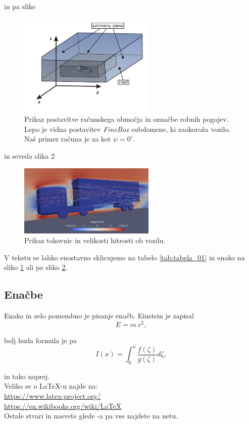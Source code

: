 \documentclass[11pt,a4]{article}
\begin{document}
in pa slike

\begin{figure}[!htbp]
	\centering \includegraphics[width=6.5cm]{figs/geometry_3D.pdf}
	\caption{Prikaz postavitve računskega območja in označbe robnih pogojev. Lepo je vidna postavitev \emph{FineBox} subdomene, ki zaokoroža vozilo. Naš primer računa je za kot $\psi=0^\circ$.}
	\label{fig:slika_01}
\end{figure}

\newpage

in seveda slika 2

\begin{figure}[!htbp]
	\centering \includegraphics[width=6.5cm]{figs/res_L_01.png}
	\caption{Prikaz tokovnic in velikosti hitrosti ob vozilu.}
	\label{fig:slika_02}
\end{figure}

V tekstu se lahko enostavno sklicujemo na tabelo \ref{tab:tabela_01} in enako na sliko \ref{fig:slika_01} ali pa sliko \ref{fig:slika_02}.

\subsection{Enačbe}
Enako in zelo pomembno je pisanje enačb. Einstein je zapisal
\[
E = m \: c^2,
\]

bolj huda formula je pa
\[
I(x) = \int_0^x \frac{f(\zeta)}{g(\zeta)} d\zeta,
\]

in tako naprej.\\[1cm]

Veliko se o \LaTeX-u najde na:\\[0.2cm]
\url{https://www.latex-project.org/}\\
\url{https://en.wikibooks.org/wiki/LaTeX}\\[0.5cm]
Ostale stvari in nasvete glede \LaTeXe-a pa vse najdete na netu. 
\end{document}
